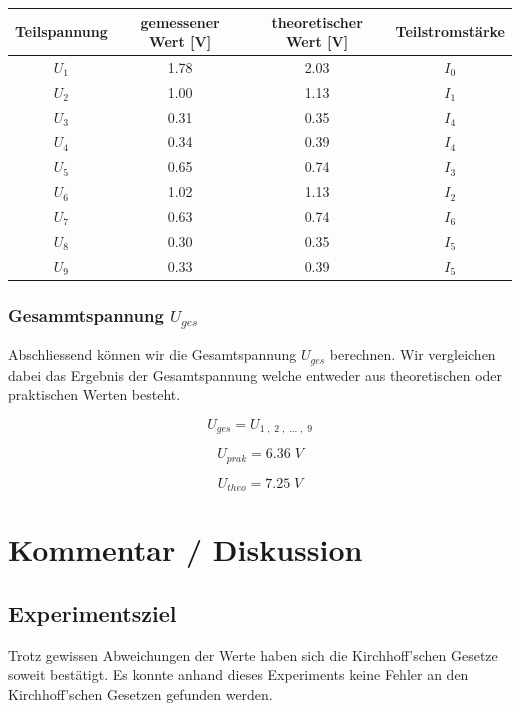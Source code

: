 \documentclass[a4paper,12pt]{article}
\begin{document}
\begin{table}[H]
\centering
    \begin{tabular}{|c|c|c|c|}
        \hline
        \textbf{Teilspannung} & \textbf{gemessener Wert [V]} & \textbf{theoretischer Wert [V]} & \textbf{Teilstromstärke}\\
        \hline
        $U_1$ & 1.78 & 2.03 & $I_0$\\
        \hline
        $U_2$ & 1.00 & 1.13 & $I_1$\\
        \hline
        $U_3$ & 0.31 & 0.35 & $I_4$\\
        \hline
        $U_4$ & 0.34 & 0.39 & $I_4$\\
        \hline
        $U_5$ & 0.65 & 0.74 & $I_3$\\
        \hline
        $U_6$ & 1.02 & 1.13 & $I_2$\\
        \hline
        $U_7$ & 0.63 & 0.74 & $I_6$\\
        \hline
        $U_8$ & 0.30 & 0.35 & $I_5$\\
        \hline
        $U_9$ & 0.33 & 0.39 & $I_5$\\
        \hline
    \end{tabular}
\end{table}

\subsubsection{Gesammtspannung $U_{ges}$}

Abschliessend können wir die Gesamtspannung $U_{ges}$ berechnen. Wir vergleichen dabei das Ergebnis der Gesamtspannung welche entweder aus theoretischen oder praktischen Werten besteht.

$$U_{ges} = U_{1\;,\;2\;,\; ...\;,\; 9}$$

$$U_{prak} = 6.36\; V$$

$$U_{theo} = 7.25\; V$$

\section{Kommentar / Diskussion}

\subsection{Experimentsziel}

Trotz gewissen Abweichungen der Werte haben sich die Kirchhoff'schen Gesetze soweit bestätigt. Es konnte anhand dieses Experiments keine Fehler an den Kirchhoff'schen Gesetzen gefunden werden.
\end{document}
